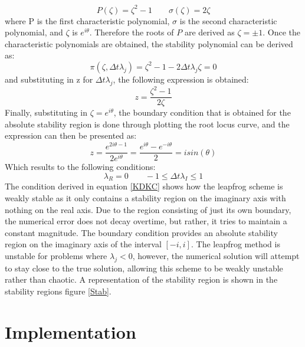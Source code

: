 \documentclass[conf]{new-aiaa}
\begin{document}
        \begin{equation}
        P(\zeta) = \zeta^2 - 1 \qquad \sigma(\zeta) = 2\zeta
        \end{equation}
        where P is the first characteristic polynomial, $\sigma$ is the second characteristic polynomial, and $\zeta$ is $e^{i\theta}$. Therefore the roots of $P$ are derived as $\zeta = \pm 1$. Once the characteristic polynomials are obtained, the stability polynomial can be derived as:
        \begin{equation}
        \pi(\zeta,\Delta t \lambda_j) = \zeta^2 - 1 - 2\Delta t \lambda_j \zeta = 0
        \end{equation}
        and substituting in z for $\Delta t \lambda_j$, the following expression is obtained:
        \begin{equation}
        z = \frac{\zeta^2 - 1}{2\zeta}
        \end{equation}
        Finally, substituting in $\zeta = e^{i\theta}$, the boundary condition that is obtained for the absolute stability region is done through plotting the root locus curve, and the expression 
        can then be presented as:
        \begin{equation}
            z = \frac{e^{2i\theta - 1}}{2e^{i\theta}} = \frac{e^{i\theta} - e^{-i\theta}}{2} = isin(\theta)
        \end{equation}
        Which results to the following conditions:
        \begin{equation}
            \lambda_R = 0 \qquad -1 \le \Delta t \lambda_I \le 1 \label{KDKC}
        \end{equation}
         The condition derived in equation \eqref{KDKC} shows how the leapfrog scheme is weakly stable as it only contains a stability region on the imaginary axis with nothing on the real axis. Due to the region consisting of just its own boundary, the numerical error does not decay overtime, but rather, it tries to maintain a constant magnitude. The boundary condition provides an absolute stability region on the imaginary axis of the interval $[-i,i]$. The leapfrog method is unstable for problems where $\lambda_j < 0$, however, the numerical solution will attempt to stay close to the true solution, allowing this scheme to be weakly unstable rather than chaotic. A representation of the stability region is shown in the stability regions figure \ref{Stab}.

\section{Implementation}
   
\end{document}
